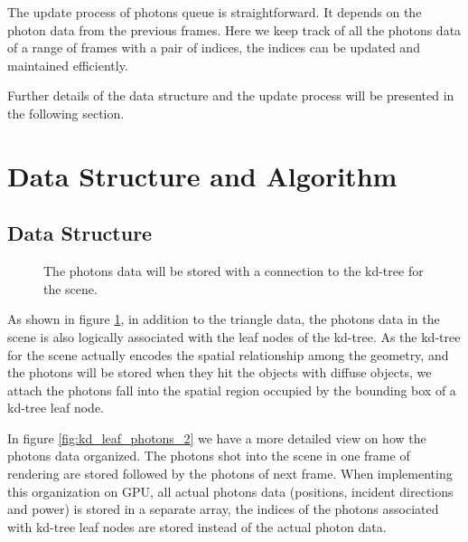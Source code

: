 The update process of photons queue is straightforward. It depends on the photon data from the previous frames. Here we keep track of all the photons data of a range of frames with a pair of indices, the indices can be updated and maintained efficiently. 

Further details of the data structure and the update process will be presented in the following section.

\section{Data Structure and Algorithm}

\subsection{Data Structure}

\begin{figure}
    \centering
    \renewcommand{\thefigure}{\thechapter.\arabic{figure}}
    \caption[Association of kd-tree and photons data]{The photons data will be stored with a connection to the kd-tree for the scene. }
    \label{fig:kd_leaf_photons}
\end{figure}

As shown in figure \ref{fig:kd_leaf_photons}, in addition to the triangle data, the photons data in the scene is also logically associated with the leaf nodes of the kd-tree. As the kd-tree for the scene actually encodes the spatial relationship among the geometry, and the photons will be stored when they hit the objects with diffuse objects, we attach the photons fall into the spatial region occupied by the bounding box of a kd-tree leaf node.


In figure \ref{fig:kd_leaf_photons_2} we have a more detailed view on how the photons data organized. The photons shot into the scene in one frame of rendering are stored followed by the photons of next frame. When implementing this organization on GPU, all actual photons data (positions, incident directions and power) is stored in a separate array, the indices of the photons associated with kd-tree leaf nodes are stored instead of the actual photon data.

